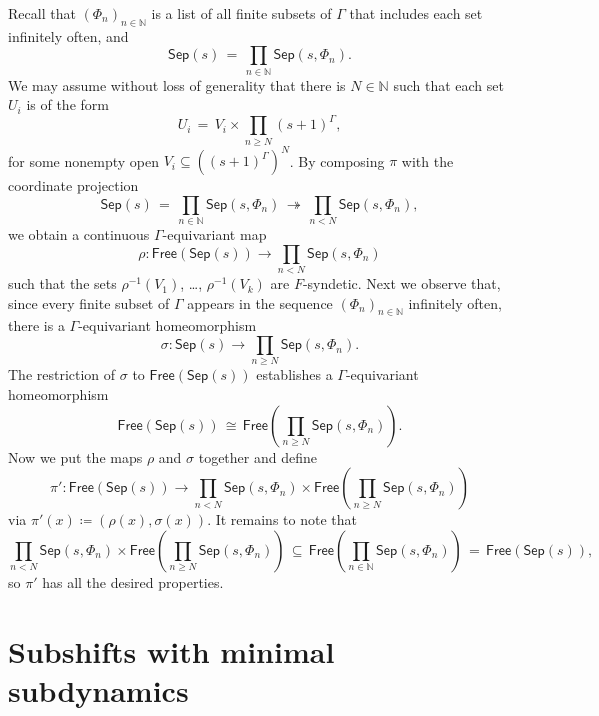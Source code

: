 \documentclass[11pt,reqno,psamsfonts]{amsart}
\theoremstyle{bfnote}
\theoremstyle{definition}
\theoremstyle{remark}
\newcommand{\0}{\varnothing}
\renewcommand{\geq}{\geqslant}
\newcommand{\defeq}{\coloneqq}
\newcommand{\G}{\Gamma}
\newcommand{\Free}{\mathsf{Free}}
\newcommand{\N}{\mathbb{N}}
\newcommand{\Sep}{\mathsf{Sep}}
\numberwithin{equation}{section}
\begin{document}
        Recall that $(\Phi_n)_{n \in \N}$ is a list of all finite subsets of $\G$ that includes each set infinitely often, and
        \[
            \Sep(s) \,=\, \prod_{n \in \N} \Sep(s, \Phi_n).
        \]
        We may assume without loss of generality that there is $N \in \N$ such that each set $U_i$ is of the form
        \[
            U_i \,=\, V_i \times \prod_{n \geq N} (s+1)^\G,
        \]
        for some nonempty open $V_i \subseteq ((s+1)^\G)^N$. By composing $\pi$ with the coordinate projection
        \[
            \Sep(s) \,=\, \prod_{n \in \N} \Sep(s,\Phi_n) \,\twoheadrightarrow\, \prod_{n < N} \Sep(s,\Phi_n),
        \]
        we obtain a continuous $\G$-equivariant map
        \[
            \rho \colon \Free(\Sep(s)) \to \prod_{n < N}  \Sep(s,\Phi_n)
        \]
        such that the sets $\rho^{-1}(V_1)$, \ldots, $\rho^{-1}(V_k)$ are $F$-syndetic. Next we observe that, since every finite subset of $\G$ appears in the sequence $(\Phi_n)_{n \in \N}$ infinitely often, there is a $\G$-equivariant homeomorphism %
        \[
            \sigma \colon \Sep(s) \to \prod_{n \geq N} \Sep(s,\Phi_n).
        \]
        The restriction of $\sigma$ to $\Free(\Sep(s))$ establishes a $\G$-equivariant homeomorphism
        \[
            \Free(\Sep(s)) \,\cong\, \Free\left(\prod_{n \geq N} \Sep(s,\Phi_n)\right).
        \]
        Now we put the maps $\rho$ and $\sigma$ together and define
        \[
            \pi' \colon \Free(\Sep(s)) \to \prod_{n < N} \Sep(s,\Phi_n) \times \Free\left(\prod_{n \geq N} \Sep(s,\Phi_n)\right)
        \]
        via $\pi'(x) \defeq (\rho(x), \sigma(x))$. It remains to note that
        \[
            \prod_{n < N} \Sep(s,\Phi_n) \times \Free\left(\prod_{n \geq N} \Sep(s,\Phi_n)\right) \,\subseteq\, \Free\left(\prod_{n \in \N} \Sep(s, \Phi_n)\right) \,=\, \Free(\Sep(s)),
        \]
        so $\pi'$ has all the desired properties.

    \section{Subshifts with minimal subdynamics}%
    \label{sec:subshift}
\end{document}
